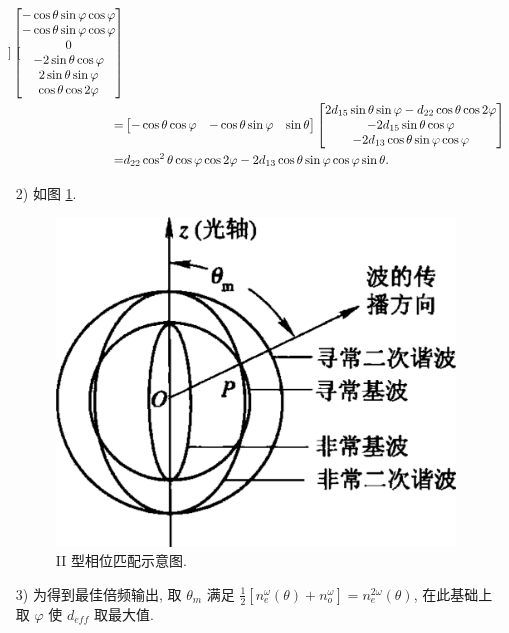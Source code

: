 \documentclass{assignment}
\begin{document}
\begin{sol}
\begin{itemize}
\begin{align}
\begin{bmatrix}
            \end{bmatrix}\begin{bmatrix}
                -\cos\theta\sin\varphi\cos\varphi\\
                -\cos\theta\sin\varphi\cos\varphi\\
                0\\
                -2\sin\theta\cos\varphi\\
                2\sin\theta\sin\varphi\\
                \cos\theta\cos 2\varphi
            \end{bmatrix}\\
            \notag=&\begin{bmatrix}
                -\cos\theta\cos\varphi&-\cos\theta\sin\varphi&\sin\theta
            \end{bmatrix}\begin{bmatrix}
                2d_{15}\sin\theta\sin\varphi-d_{22}\cos\theta\cos 2\varphi\\
                -2d_{15}\sin\theta\cos\varphi\\
                -2d_{13}\cos\theta\sin\varphi\cos\varphi
            \end{bmatrix}\\
            =&d_{22}\cos^2\theta\cos\varphi\cos 2\varphi-2d_{13}\cos\theta\sin\varphi\cos\varphi\sin\theta.
        \end{align}
        \item[2)] 如图 \ref{A1-3}.
        \begin{figure}[H]
            \centering
            \includegraphics[width=.5\columnwidth]{Figures/A1-3.png}
            \caption{II 型相位匹配示意图.}
            \label{A1-3}
        \end{figure}
        \item[3)] 为得到最佳倍频输出, 取 $\theta_m$ 满足 $\frac{1}{2}[n_e^{\omega}(\theta)+n_o^{\omega}]=n_e^{2\omega}(\theta)$, 在此基础上取 $\varphi$ 使 $d_{eff}$ 取最大值.
    \end{itemize}
\end{sol}
\end{document}
